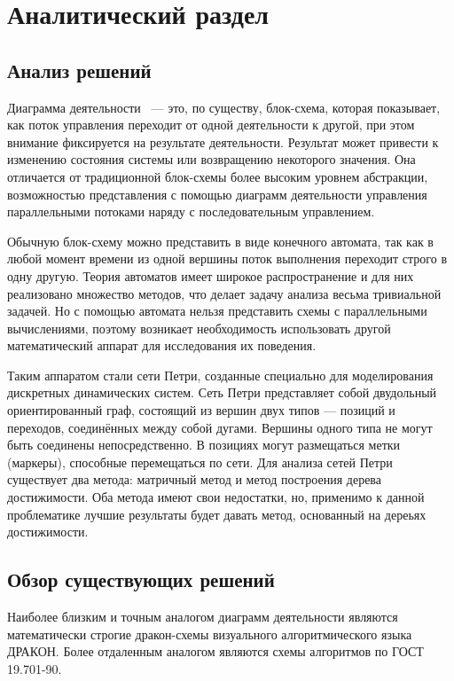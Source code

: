 \chapter{Аналитический раздел}
\label{cha:analysis}

\section{Анализ решений}

Диаграмма деятельности ~--- это, по существу, блок-схема, которая показывает, как поток управления переходит от одной деятельности к другой, при этом внимание фиксируется на результате деятельности. Результат может привести к изменению состояния системы или возвращению некоторого значения. Она отличается от традиционной блок-схемы более высоким уровнем абстракции, возможностью представления с помощью диаграмм деятельности управления параллельными потоками наряду с последовательным управлением.

Обычную блок-схему можно представить в виде конечного автомата, так как в любой момент времени из одной вершины поток выполнения переходит строго в одну другую. Теория автоматов имеет широкое распространение и для них реализовано множество методов, что делает задачу анализа весьма тривиальной задачей. Но с помощью автомата нельзя представить схемы с параллельными вычислениями, поэтому возникает необходимость использовать другой математический аппарат для исследования их поведения.

Таким аппаратом стали сети Петри, созданные специально для моделирования дискретных динамических систем. Сеть Петри представляет собой двудольный ориентированный граф, состоящий из вершин двух типов — позиций и переходов, соединённых между собой дугами. Вершины одного типа не могут быть соединены непосредственно. В позициях могут размещаться метки (маркеры), способные перемещаться по сети. Для анализа сетей Петри существует два метода: матричный метод и метод построения дерева достижимости. Оба метода имеют свои недостатки, но, применимо к данной проблематике лучшие результаты будет давать метод, основанный на дереьях достижимости.

\section{Обзор существующих решений}

Наиболее близким и точным аналогом диаграмм деятельности являются математически строгие дракон-схемы визуального алгоритмического языка ДРАКОН. Более отдаленным аналогом являются схемы алгоритмов по ГОСТ 19.701-90.

